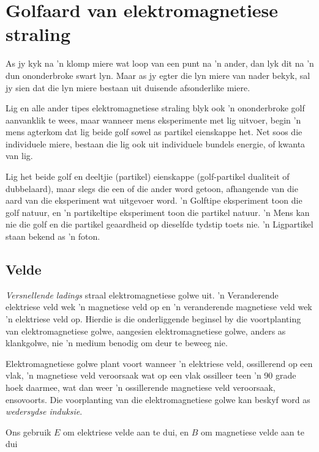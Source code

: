     \label{m38777*cid3}
            \section{Golfaard van e\-lek\-tro\-mag\-ne\-tie\-se straling}
            \nopagebreak
      \label{m38777*id186686}As jy kyk na 'n klomp miere wat loop van een punt na 'n ander, dan lyk dit na 'n dun ononderbroke swart lyn. Maar as jy egter die lyn miere van nader bekyk, sal jy sien dat die lyn miere bestaan uit duisende afsonderlike miere.\par 
      \label{m38777*id187029}Lig en alle ander tipes elektromagnetiese straling blyk ook 'n ononderbroke golf aanvanklik te wees, maar wanneer mens eksperimente met lig uitvoer, begin 'n mens agterkom dat lig beide golf sowel as partikel eienskappe het. Net soos die individuele miere, bestaan die lig ook uit individuele bundels energie, of kwanta van lig.\par 
     
 \label{m38777*id187035}Lig het beide golf en deeltjie (partikel) eienskappe (golf-partikel dualiteit of dubbelaard), maar slegs die een of die ander word getoon, afhangende van die aard van die eksperiment wat uitgevoer word. 'n Golftipe eksperiment toon die golf natuur, en 'n partikeltipe eksperiment toon die partikel natuur. 'n Mens kan nie die golf en die partikel geaardheid op dieselfde tydstip toets nie. 'n Ligpartikel staan bekend as 'n foton.\par 







\subsection*{Velde}
            \nopagebreak
      \label{m38777*id187125}\textit{Versnellende ladings} straal elektromagnetiese golwe uit. 'n Veranderende elektriese veld wek 'n magnetiese veld op en 'n veranderende magnetiese veld wek 'n elektriese veld op. Hierdie is die onderliggende beginsel by die voortplanting van elektromagnetiese golwe, aangesien elektromagnetiese golwe, anders as klankgolwe, nie 'n medium benodig om deur te beweeg nie.  


E\-lek\-tro\-mag\-ne\-tie\-se golwe plant voort wanneer 'n elektriese veld, ossillerend op een vlak, 'n magnetiese veld veroorsaak wat op een vlak ossilleer teen 'n 90 grade hoek daarmee, wat dan weer 'n ossillerende magnetiese veld veroorsaak, ensovoorts.   Die voorplanting van die elektromagnetiese golwe kan beskyf word as \textsl{wedersydse induksie}.\par Ons gebruik $E$ om elektriese velde aan te dui, en $B$ om magnetiese velde aan te dui\par

